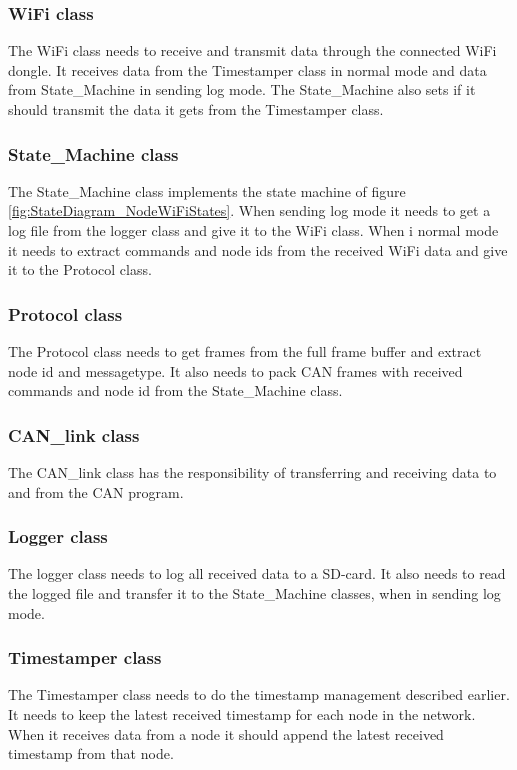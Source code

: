 \subsubsection*{WiFi class}
The WiFi class needs to receive and transmit data through the connected WiFi dongle.
It receives data from the Timestamper class in normal mode and data from State\_Machine in sending log mode.
The State\_Machine also sets if it should transmit the data it gets from the Timestamper class. 

\subsubsection*{State\_Machine class}
The State\_Machine class implements the state machine of figure \ref{fig:StateDiagram_NodeWiFiStates}.
When sending log mode it needs to get a log file from the logger class and give it to the WiFi class.
When i normal mode it needs to extract commands and node ids from the received WiFi data and give it to the Protocol class.

\subsubsection*{Protocol class}
The Protocol class needs to get frames from the full frame buffer and extract node id and messagetype. 
It also needs to pack CAN frames with received commands and node id from the State\_Machine class.

\subsubsection*{CAN\_link class}
The CAN\_link class has the responsibility of transferring and receiving data to
and from the CAN program.

\subsubsection*{Logger class}
The logger class needs to log all received data to a SD-card.
It also needs to read the logged file and transfer it to the State\_Machine classes, when in sending log mode.

\subsubsection*{Timestamper class}
The Timestamper class needs to do the timestamp management described earlier.
It needs to keep the latest received timestamp for each node in the network.
When it receives data from a node it should append the latest received timestamp from that node.  